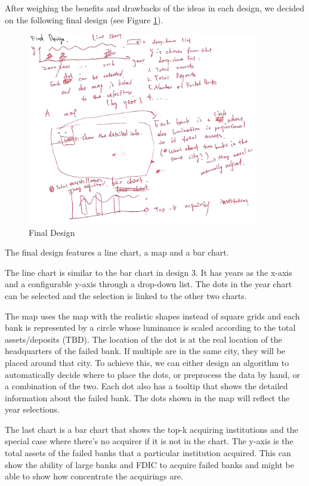 After weighing the benefits and drawbacks of the ideas in each design, we
decided on the following final design (see Figure \ref{fig:final_design}).

\begin{figure}[!h]
    \centering
    \includegraphics[width=0.9\textwidth]{fig/final_design}
    \caption{Final Design}
    \label{fig:final_design}
\end{figure}

The final design features a line chart, a map and a bar chart.

The line chart is similar to the bar chart in design 3. It has years as the
x-axis and a configurable y-axis through a drop-down list. The dots in the
year chart can be selected and the selection is linked to the other two
charts.

The map uses the map with the realistic shapes instead of square grids and
each bank is represented by a circle whose luminance is scaled according to
the total assets/deposits (TBD). The location of the dot is at the real
location of the headquarters of the failed bank. If multiple are in the same
city, they will be placed around that city. To achieve this, we can either
design an algorithm to automatically decide where to place the dots, or
preprocess the data by hand, or a combination of the two. Each dot also has a
tooltip that shows the detailed information about the failed bank. The dots
shown in the map will reflect the year selections.

The last chart is a bar chart that shows the top-k acquiring institutions and
the special case where there's no acquirer if it is not in the chart. The
y-axis is the total assets of the failed banks that a particular institution
acquired. This can show the ability of large banks and FDIC to acquire failed
banks and might be able to show how concentrate the acquirings are.

